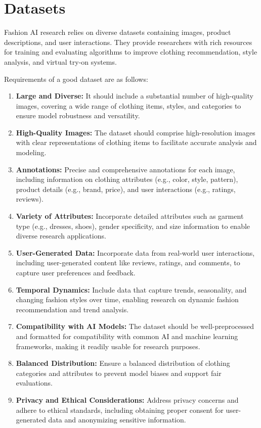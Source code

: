 \section{Datasets} \label{section:datasets}
	Fashion AI research relies on diverse datasets containing images, product descriptions, and user interactions. They provide researchers with rich resources for training and evaluating algorithms to improve clothing recommendation, style analysis, and virtual try-on systems.

	Requirements of a good dataset are as follows:

	\begin{enumerate}
		\item \textbf{Large and Diverse:} It should include a substantial number of high-quality images, covering a wide range of clothing items, styles, and categories to ensure model robustness and versatility.
		\item \textbf{High-Quality Images:} The dataset should comprise high-resolution images with clear representations of clothing items to facilitate accurate analysis and modeling.
		\item \textbf{Annotations:} Precise and comprehensive annotations for each image, including information on clothing attributes (e.g., color, style, pattern), product details (e.g., brand, price), and user interactions (e.g., ratings, reviews).
		\item \textbf{Variety of Attributes:} Incorporate detailed attributes such as garment type (e.g., dresses, shoes), gender specificity, and size information to enable diverse research applications.
		\item \textbf{User-Generated Data:} Incorporate data from real-world user interactions, including user-generated content like reviews, ratings, and comments, to capture user preferences and feedback.
		\item \textbf{Temporal Dynamics:} Include data that capture trends, seasonality, and changing fashion styles over time, enabling research on dynamic fashion recommendation and trend analysis.
		\item \textbf{Compatibility with AI Models:} The dataset should be well-preprocessed and formatted for compatibility with common AI and machine learning frameworks, making it readily usable for research purposes.
		\item \textbf{Balanced Distribution:} Ensure a balanced distribution of clothing categories and attributes to prevent model biases and support fair evaluations.
		\item \textbf{Privacy and Ethical Considerations:} Address privacy concerns and adhere to ethical standards, including obtaining proper consent for user-generated data and anonymizing sensitive information.

\end{enumerate}
